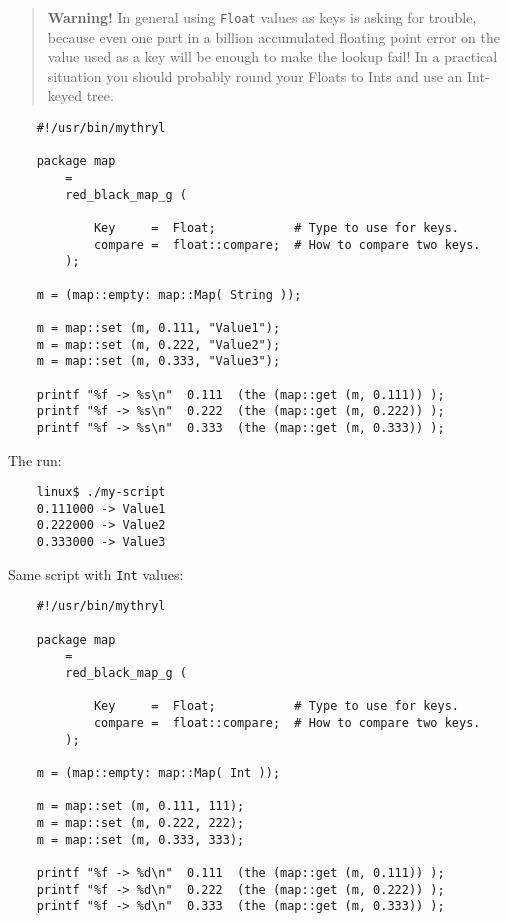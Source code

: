 \begin{quotation}
{\bf Warning!} In general using {\tt Float} values as keys is 
asking for trouble, because even one part in a billion accumulated 
floating point error on the value used as a key will be enough to make the 
lookup fail!  In a practical situation you should probably round 
your Floats to Ints and use an Int-keyed tree.
\end{quotation}

\begin{verbatim}
    #!/usr/bin/mythryl

    package map
        =
        red_black_map_g (

            Key     =  Float;           # Type to use for keys.
            compare =  float::compare;  # How to compare two keys.
        );

    m = (map::empty: map::Map( String ));

    m = map::set (m, 0.111, "Value1");
    m = map::set (m, 0.222, "Value2");
    m = map::set (m, 0.333, "Value3");

    printf "%f -> %s\n"  0.111  (the (map::get (m, 0.111)) );
    printf "%f -> %s\n"  0.222  (the (map::get (m, 0.222)) );
    printf "%f -> %s\n"  0.333  (the (map::get (m, 0.333)) );
\end{verbatim}

The run:

\begin{verbatim}
    linux$ ./my-script
    0.111000 -> Value1
    0.222000 -> Value2
    0.333000 -> Value3
\end{verbatim}

Same script with {\tt Int} values:

\begin{verbatim}
    #!/usr/bin/mythryl

    package map
        =
        red_black_map_g (

            Key     =  Float;           # Type to use for keys.
            compare =  float::compare;  # How to compare two keys.
        );

    m = (map::empty: map::Map( Int ));

    m = map::set (m, 0.111, 111);
    m = map::set (m, 0.222, 222);
    m = map::set (m, 0.333, 333);

    printf "%f -> %d\n"  0.111  (the (map::get (m, 0.111)) );
    printf "%f -> %d\n"  0.222  (the (map::get (m, 0.222)) );
    printf "%f -> %d\n"  0.333  (the (map::get (m, 0.333)) );
\end{verbatim}

